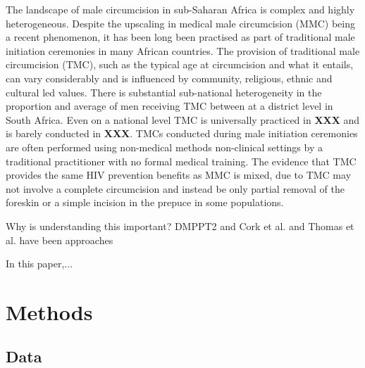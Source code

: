 \documentclass{article}
\begin{document}
The landscape of male circumcision in sub-Saharan Africa is complex and highly heterogeneous. Despite the upscaling in medical male circumcision (MMC) being a recent phenomenon, it has been long been practised as part of traditional male initiation ceremonies in many African countries. The provision of traditional male circumcision (TMC), such as the typical age at circumcision and what it entails, can vary considerably and is influenced by community, religious, ethnic and cultural led values. There is substantial sub-national heterogeneity in the proportion and average of men receiving TMC between at a district level in South Africa. Even on a national level TMC is universally practiced in {\color{red}\bf XXX} and is barely conducted in {\color{red}\bf XXX}. TMCs conducted during male initiation ceremonies are often performed using non-medical methods non-clinical settings by a traditional practitioner with no formal medical training. The evidence that TMC provides the same HIV prevention benefits as MMC is mixed, due to TMC may not involve a complete circumcision and instead be only partial removal of the foreskin or a simple incision in the prepuce in some populations.   

Why is understanding this important? DMPPT2 and Cork et al. and Thomas et al. have been approaches 

In this paper,...











\newpage
\section{Methods}
\label{sec:orga131cc6}


\subsection{Data}
\label{sec:org020fc8c}
\end{document}
